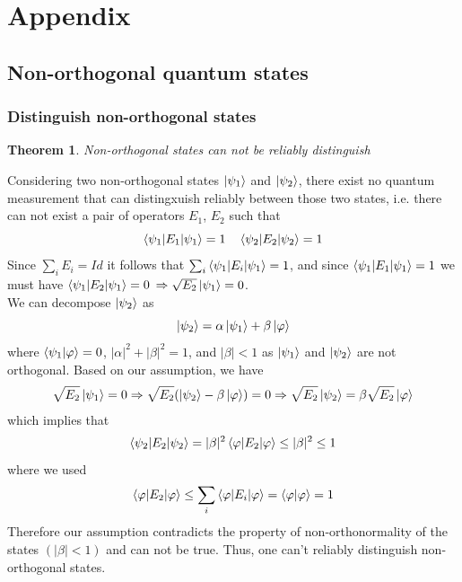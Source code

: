 \documentclass{article}
\newtheorem{theorem}{Theorem}
\begin{document}
\section{Appendix}
\subsection{Non-orthogonal quantum states}
\subsubsection*{Distinguish non-orthogonal states}
\begin{theorem}
    Non-orthogonal states can not be reliably distinguish
\end{theorem}
Considering two non-orthogonal states $\ket{\psi_1}$ and $\ket{\psi_2}$, there
exist no quantum measurement that can distingxuish reliably between those two
states, i.e. there can not exist a pair of operators $E_1$, $E_2$ such that
\begin{equation}
    \braket{\psi_1|E_1|\psi_1} = 1 \quad \braket{\psi_2|E_2|\psi_2} = 1
\end{equation}
Since $\sum_iE_i=Id$ it follows that $\sum_i\braket{\psi_1|E_i|\psi_1}=1$, and
since $\braket{\psi_1|E_1|\psi_1} = 1$ we must have $\braket{\psi_1|E_2 |\psi_1}
= 0$ $\Rightarrow \sqrt{E_2}\ket{\psi_1}=0$. \\\noindent
We can decompose $\ket{\psi_2}$ as
\begin{equation}
    \ket{\psi_2} = \alpha\ket{\psi_1}+\beta\ket{\varphi}
\end{equation}
where $\braket{\psi_1|\varphi}=0$, $|\alpha|^2 +|\beta|^2 = 1$, and $|\beta|<1$
as $\ket{\psi_1}$ and $\ket{\psi_2}$ are not orthogonal. Based on our
assumption, we have
\begin{equation}
    \begin{aligned}
        \sqrt{E_2}\ket{\psi_1} = 0
        \Rightarrow \sqrt{E_2}(\ket{\psi_2} - \beta\ket{\varphi}) = 0
        \Rightarrow \sqrt{E_2}\ket{\psi_2} = \beta\sqrt{E_2}\ket{\varphi}
    \end{aligned}
\end{equation}
which implies that
\begin{equation}
    \braket{\psi_2|E_2|\psi_2} = |\beta|^2 \braket{\varphi|E_2|\varphi} \leq |\beta|^2 \leq 1
\end{equation}
where we used
\begin{equation}
\braket{\varphi|E_2|\varphi} \leq \sum_i\braket{\varphi|E_i|\varphi} = \braket{\varphi|\varphi} = 1
\end{equation}
Therefore our assumption contradicts the property of non-orthonormality of the
states $(|\beta|<1)$ and can not be true. Thus, one can't reliably distinguish
non-orthogonal states.
\end{document}
